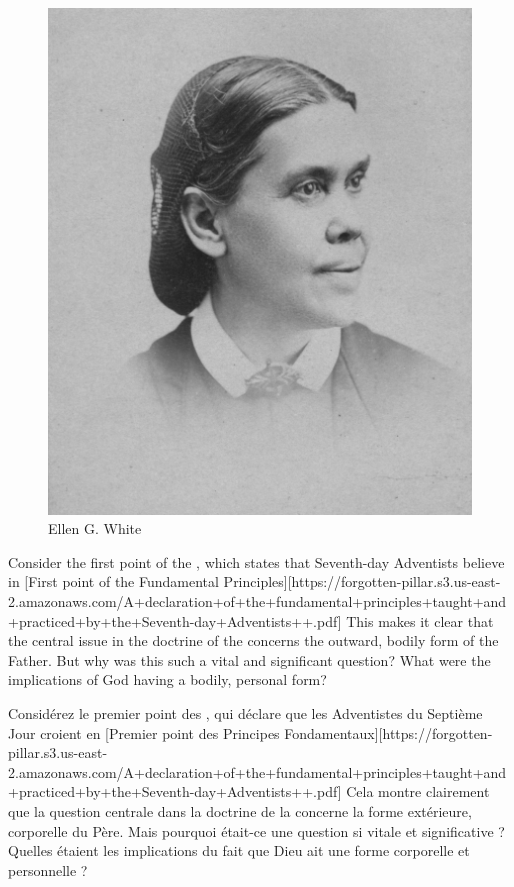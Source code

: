 \begin{figure}[t]
    \centering
    \includegraphics[width=0.65\linewidth]{images/ellen-white.jpg}
    \caption*{Ellen G. White}
    \label{fig:ellen-g-white}
\end{figure}


Consider the first point of the , which states that Seventh-day Adventists believe in [First point of the Fundamental Principles][https://forgotten-pillar.s3.us-east-2.amazonaws.com/A+declaration+of+the+fundamental+principles+taught+and+practiced+by+the+Seventh-day+Adventists++.pdf] This makes it clear that the central issue in the doctrine of the  concerns the outward, bodily form of the Father. But why was this such a vital and significant question? What were the implications of God having a bodily, personal form?


Considérez le premier point des , qui déclare que les Adventistes du Septième Jour croient en [Premier point des Principes Fondamentaux][https://forgotten-pillar.s3.us-east-2.amazonaws.com/A+declaration+of+the+fundamental+principles+taught+and+practiced+by+the+Seventh-day+Adventists++.pdf] Cela montre clairement que la question centrale dans la doctrine de la  concerne la forme extérieure, corporelle du Père. Mais pourquoi était-ce une question si vitale et significative ? Quelles étaient les implications du fait que Dieu ait une forme corporelle et personnelle ?


